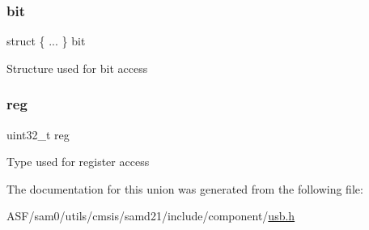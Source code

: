 \subsubsection{\texorpdfstring{bit}{bit}}
{\footnotesize\ttfamily struct \{ ... \}   bit}

Structure used for bit access \mbox{\label{union_u_s_b___h_o_s_t___a_d_d_r___type_a6b91636401516a477989a336376d7b40}} 
\subsubsection{\texorpdfstring{reg}{reg}}
{\footnotesize\ttfamily uint32\+\_\+t reg}

Type used for register access 

The documentation for this union was generated from the following file\+:\begin{DoxyCompactItemize}
\item 
A\+S\+F/sam0/utils/cmsis/samd21/include/component/\mbox{\hyperlink{component_2usb_8h}{usb.\+h}}\end{DoxyCompactItemize}
